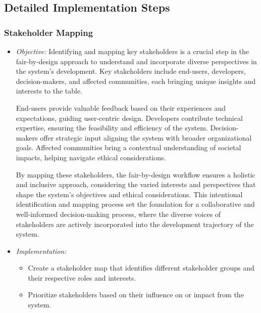 \documentclass[12pt,a4paper,openright,twoside]{book}
\begin{document}
\subsection{Detailed Implementation Steps}

\subsubsection{Stakeholder Mapping}

\begin{itemize}
    
    \item \emph{Objective:} Identifying and mapping key stakeholders is a crucial step in the fair-by-design approach to understand and incorporate diverse perspectives in the system's development. Key stakeholders include end-users, developers, decision-makers, and affected communities, each bringing unique insights and interests to the table.

    End-users provide valuable feedback based on their experiences and expectations, guiding user-centric design. Developers contribute technical expertise, ensuring the feasibility and efficiency of the system. Decision-makers offer strategic input aligning the system with broader organizational goals. Affected communities bring a contextual understanding of societal impacts, helping navigate ethical considerations.
    
    By mapping these stakeholders, the fair-by-design workflow ensures a holistic and inclusive approach, considering the varied interests and perspectives that shape the system's objectives and ethical considerations. This intentional identification and mapping process set the foundation for a collaborative and well-informed decision-making process, where the diverse voices of stakeholders are actively incorporated into the development trajectory of the system.

    \item \emph{Implementation:}
    
    \begin{itemize}
    
        \item Create a stakeholder map that identifies different stakeholder groups and their respective roles and interests.
    
        \item Prioritize stakeholders based on their influence on or impact from the system.
    
    \end{itemize}

\end{itemize}
\end{document}
